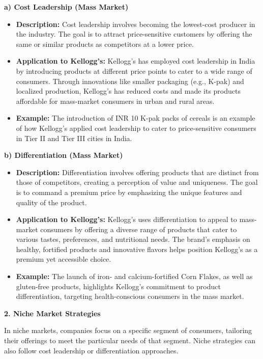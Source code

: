 \documentclass[10pt,a4paper]{book}
\begin{document}
\textbf{a) Cost Leadership (Mass Market)}
\begin{itemize}
    \item \textbf{Description:} Cost leadership involves becoming the lowest-cost producer in the industry. The goal is to attract price-sensitive customers by offering the same or similar products as competitors at a lower price.
    \item \textbf{Application to Kellogg's:} Kellogg's has employed cost leadership in India by introducing products at different price points to cater to a wide range of consumers. Through innovations like smaller packaging (e.g., K-pak) and localized production, Kellogg's has reduced costs and made its products affordable for mass-market consumers in urban and rural areas.
    \item \textbf{Example:} The introduction of INR 10 K-pak packs of cereals is an example of how Kellogg's applied cost leadership to cater to price-sensitive consumers in Tier II and Tier III cities in India.
\end{itemize}

\vspace{0.5cm}

\textbf{b) Differentiation (Mass Market)}
\begin{itemize}
    \item \textbf{Description:} Differentiation involves offering products that are distinct from those of competitors, creating a perception of value and uniqueness. The goal is to command a premium price by emphasizing the unique features and quality of the product.
    \item \textbf{Application to Kellogg's:} Kellogg’s uses differentiation to appeal to mass-market consumers by offering a diverse range of products that cater to various tastes, preferences, and nutritional needs. The brand’s emphasis on healthy, fortified products and innovative flavors helps position Kellogg’s as a premium yet accessible choice.
    \item \textbf{Example:} The launch of iron- and calcium-fortified Corn Flakes, as well as gluten-free products, highlights Kellogg's commitment to product differentiation, targeting health-conscious consumers in the mass market.
\end{itemize}

\vspace{0.5cm}

\textbf{2. Niche Market Strategies}

In niche markets, companies focus on a specific segment of consumers, tailoring their offerings to meet the particular needs of that segment. Niche strategies can also follow cost leadership or differentiation approaches.
\end{document}
